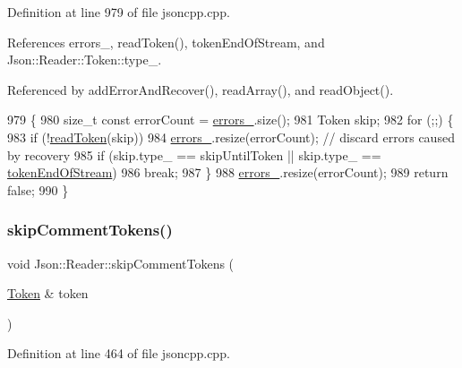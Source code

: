 Definition at line 979 of file jsoncpp.\+cpp.



References errors\+\_\+, read\+Token(), token\+End\+Of\+Stream, and Json\+::\+Reader\+::\+Token\+::type\+\_\+.



Referenced by add\+Error\+And\+Recover(), read\+Array(), and read\+Object().


\begin{DoxyCode}
979                                                       \{
980   \textcolor{keywordtype}{size\_t} \textcolor{keyword}{const} errorCount = \hyperlink{class_json_1_1_reader_a1bbce45dc4df753bed60c129f4b5147c}{errors\_}.size();
981   Token skip;
982   \textcolor{keywordflow}{for} (;;) \{
983     \textcolor{keywordflow}{if} (!\hyperlink{class_json_1_1_reader_a7cb0631963cc0fd4ff6ed0f570976864}{readToken}(skip))
984       \hyperlink{class_json_1_1_reader_a1bbce45dc4df753bed60c129f4b5147c}{errors\_}.resize(errorCount); \textcolor{comment}{// discard errors caused by recovery}
985     \textcolor{keywordflow}{if} (skip.type\_ == skipUntilToken || skip.type\_ == \hyperlink{class_json_1_1_reader_aa35e6ab574dc399a0a645ad98ed66bc9a87fd3ad9cae11a8afe2bd022d8ab90f4}{tokenEndOfStream})
986       \textcolor{keywordflow}{break};
987   \}
988   \hyperlink{class_json_1_1_reader_a1bbce45dc4df753bed60c129f4b5147c}{errors\_}.resize(errorCount);
989   \textcolor{keywordflow}{return} \textcolor{keyword}{false};
990 \}
\end{DoxyCode}
\mbox{\label{class_json_1_1_reader_a22e677ef400d8223f27e631b4cd4b821}} 
\subsubsection{\texorpdfstring{skip\+Comment\+Tokens()}{skipCommentTokens()}}
{\footnotesize\ttfamily void Json\+::\+Reader\+::skip\+Comment\+Tokens (\begin{DoxyParamCaption}\item[{\hyperlink{class_json_1_1_reader_1_1_token}{Token} \&}]{token }\end{DoxyParamCaption})\hspace{0.3cm}{\ttfamily [private]}}



Definition at line 464 of file jsoncpp.\+cpp.



